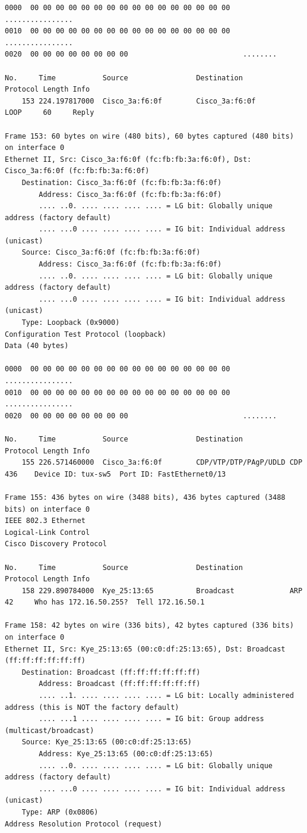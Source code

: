 \documentclass[a4paper,11pt]{article}
\begin{document}
\begin{lstlisting}
0000  00 00 00 00 00 00 00 00 00 00 00 00 00 00 00 00   ................
0010  00 00 00 00 00 00 00 00 00 00 00 00 00 00 00 00   ................
0020  00 00 00 00 00 00 00 00                           ........

No.     Time           Source                Destination           Protocol Length Info
    153 224.197817000  Cisco_3a:f6:0f        Cisco_3a:f6:0f        LOOP     60     Reply

Frame 153: 60 bytes on wire (480 bits), 60 bytes captured (480 bits) on interface 0
Ethernet II, Src: Cisco_3a:f6:0f (fc:fb:fb:3a:f6:0f), Dst: Cisco_3a:f6:0f (fc:fb:fb:3a:f6:0f)
    Destination: Cisco_3a:f6:0f (fc:fb:fb:3a:f6:0f)
        Address: Cisco_3a:f6:0f (fc:fb:fb:3a:f6:0f)
        .... ..0. .... .... .... .... = LG bit: Globally unique address (factory default)
        .... ...0 .... .... .... .... = IG bit: Individual address (unicast)
    Source: Cisco_3a:f6:0f (fc:fb:fb:3a:f6:0f)
        Address: Cisco_3a:f6:0f (fc:fb:fb:3a:f6:0f)
        .... ..0. .... .... .... .... = LG bit: Globally unique address (factory default)
        .... ...0 .... .... .... .... = IG bit: Individual address (unicast)
    Type: Loopback (0x9000)
Configuration Test Protocol (loopback)
Data (40 bytes)

0000  00 00 00 00 00 00 00 00 00 00 00 00 00 00 00 00   ................
0010  00 00 00 00 00 00 00 00 00 00 00 00 00 00 00 00   ................
0020  00 00 00 00 00 00 00 00                           ........

No.     Time           Source                Destination           Protocol Length Info
    155 226.571460000  Cisco_3a:f6:0f        CDP/VTP/DTP/PAgP/UDLD CDP      436    Device ID: tux-sw5  Port ID: FastEthernet0/13  

Frame 155: 436 bytes on wire (3488 bits), 436 bytes captured (3488 bits) on interface 0
IEEE 802.3 Ethernet 
Logical-Link Control
Cisco Discovery Protocol

No.     Time           Source                Destination           Protocol Length Info
    158 229.890784000  Kye_25:13:65          Broadcast             ARP      42     Who has 172.16.50.255?  Tell 172.16.50.1

Frame 158: 42 bytes on wire (336 bits), 42 bytes captured (336 bits) on interface 0
Ethernet II, Src: Kye_25:13:65 (00:c0:df:25:13:65), Dst: Broadcast (ff:ff:ff:ff:ff:ff)
    Destination: Broadcast (ff:ff:ff:ff:ff:ff)
        Address: Broadcast (ff:ff:ff:ff:ff:ff)
        .... ..1. .... .... .... .... = LG bit: Locally administered address (this is NOT the factory default)
        .... ...1 .... .... .... .... = IG bit: Group address (multicast/broadcast)
    Source: Kye_25:13:65 (00:c0:df:25:13:65)
        Address: Kye_25:13:65 (00:c0:df:25:13:65)
        .... ..0. .... .... .... .... = LG bit: Globally unique address (factory default)
        .... ...0 .... .... .... .... = IG bit: Individual address (unicast)
    Type: ARP (0x0806)
Address Resolution Protocol (request)


\end{lstlisting}
\end{document}
